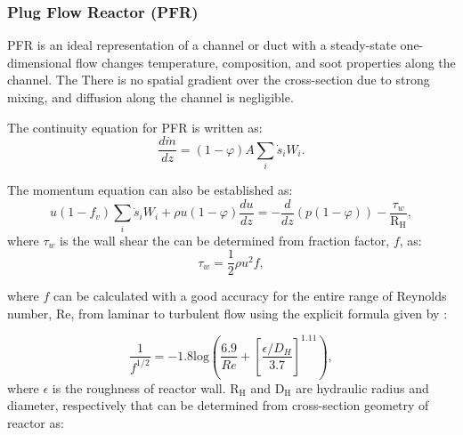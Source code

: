 \subsubsection{Plug Flow Reactor (PFR)}
\label{sec:pfr}
PFR is an ideal representation of a channel or duct with a steady-state one-dimensional flow changes temperature, composition, and soot properties along the channel. The  There is no spatial gradient over the cross-section due to strong mixing, and diffusion along the channel is negligible.


The continuity equation for PFR is written as:
\begin{equation}
	\frac{d\dot{m}}{dz} =(1-\varphi)A \sum_i \dot s_i W_i
	\label{eqn:contpfr}.
\end{equation}

The momentum equation can also be established as:
\begin{equation}
	u (1-f_v) \sum_i \dot s_i W_i + \rho u (1-\varphi) \frac{du}{dz}
	=-\frac{d}{dz}(p(1-\varphi))-\frac{\tau_{w}}{\mathrm{R_H}} 
	\label{eqn:momenpfr},
\end{equation}
 \noindent where $\tau_w$ is the wall shear the can be determined from fraction factor, $f$, as:
\begin{equation}
	\tau_w = \frac{1}{2}\rho u^2 f, 
	\label{eqn:wallshearpfr}
\end{equation}

\noindent where $f$ can be calculated with a good accuracy for the entire range of Reynolds number, Re, from laminar to turbulent flow using the explicit formula given by \citet{haaland1983simple}:

\begin{equation}
	\frac{1}{f^{1/2}} = -1.8 \mathrm{log}
	\left(
		\frac{6.9}{Re}+
		\left[ \frac{\epsilon/D_H}{3.7} \right]^{1.11}
	\right)
	\label{eqn:fpfr},
\end{equation}
\noindent where $\epsilon$ is the roughness of reactor wall.
$\mathrm{R_H}$ and $\mathrm{D_H}$ are hydraulic radius and diameter, respectively that can be determined from cross-section geometry of reactor as:

